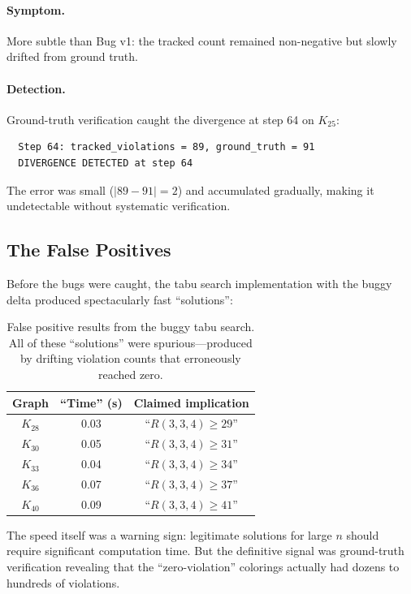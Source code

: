 \documentclass[11pt,a4paper]{article}
\theoremstyle{definition}
\theoremstyle{remark}
\begin{document}
\paragraph{Symptom.}
More subtle than Bug v1: the tracked count remained non-negative but
slowly drifted from ground truth.

\paragraph{Detection.}
Ground-truth verification caught the divergence at step 64 on $K_{25}$:
\begin{verbatim}
  Step 64: tracked_violations = 89, ground_truth = 91
  DIVERGENCE DETECTED at step 64
\end{verbatim}

The error was small ($|89 - 91| = 2$) and accumulated gradually,
making it undetectable without systematic verification.

\subsection{The False Positives}\label{sec:false-positives}

Before the bugs were caught, the tabu search implementation with the
buggy delta produced spectacularly fast ``solutions'':

\begin{table}[ht]
\centering
\caption{False positive results from the buggy tabu search.
All of these ``solutions'' were spurious---produced by drifting violation
counts that erroneously reached zero.}\label{tab:false-positives}
\begin{tabular}{@{}ccc@{}}
\toprule
\textbf{Graph} & \textbf{``Time'' (s)} & \textbf{Claimed implication} \\
\midrule
$K_{28}$ & 0.03 & ``$R(3,3,4) \ge 29$'' \\
$K_{30}$ & 0.05 & ``$R(3,3,4) \ge 31$'' \\
$K_{33}$ & 0.04 & ``$R(3,3,4) \ge 34$'' \\
$K_{36}$ & 0.07 & ``$R(3,3,4) \ge 37$'' \\
$K_{40}$ & 0.09 & ``$R(3,3,4) \ge 41$'' \\
\bottomrule
\end{tabular}
\end{table}

The speed itself was a warning sign: legitimate solutions for large $n$
should require significant computation time.
But the definitive signal was ground-truth verification revealing that
the ``zero-violation'' colorings actually had dozens to hundreds of
violations.
\end{document}
